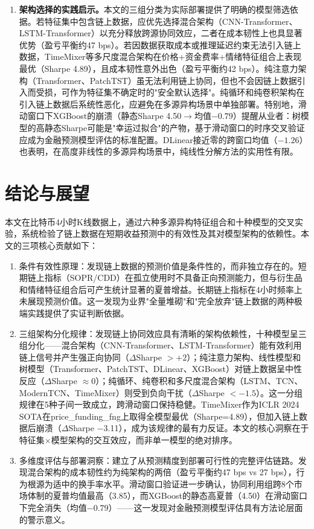 \documentclass[12pt,a4paper]{ctexart}
\begin{document}
\begin{enumerate}[label=(\arabic*),leftmargin=2.5em]
    

    \item \textbf{架构选择的实践启示。}本文的三组分类为实际部署提供了明确的模型筛选依据。若特征集中包含链上数据，应优先选择混合架构（CNN-Transformer、LSTM-Transformer）以充分释放跨源协同效应，二者在成本韧性上也具显著优势（盈亏平衡约47 bps）。若因数据获取成本或推理延迟约束无法引入链上数据，TimeMixer等多尺度混合架构在价格+资金费率+情绪特征组合上表现最优（Sharpe 4.89），且成本韧性意外出色（盈亏平衡约42 bps）。纯注意力架构（Transformer、PatchTST）虽无法利用链上协同，但也不会因链上数据引入而受损，可作为特征集不确定时的"安全默认选择"。纯循环和纯卷积架构在引入链上数据后系统性恶化，应避免在多源异构场景中单独部署。特别地，滑动窗口下XGBoost的崩溃（静态Sharpe 4.50$\to$均值$-0.79$）提醒从业者：树模型的高静态Sharpe可能是"幸运过拟合"的产物，基于滑动窗口的时序交叉验证应成为金融预测模型评估的标准配置。DLinear接近零的跨窗口均值（$-1.26$）也表明，在高度非线性的多源异构场景中，纯线性分解方法的实用性有限。
\end{enumerate}

\section{结论与展望}

本文在比特币4小时K线数据上，通过六种多源异构特征组合和十种模型的交叉实验，系统检验了链上数据在短期收益预测中的有效性及其对模型架构的依赖性。本文的三项核心贡献如下：

\begin{enumerate}[label=(\arabic*),leftmargin=2.5em]
    \item 条件有效性原理：发现链上数据的预测价值是条件性的，而非独立存在的。短期链上指标（SOPR/CDD）在孤立使用时不具备正向预测能力，但与衍生品和情绪特征组合后可产生统计显著的夏普增益。长期链上指标在4小时频率上未展现预测价值。这一发现为业界"全量堆砌"和"完全放弃"链上数据的两种极端实践提供了实证判断依据。
    \item 三组架构分化规律：发现链上协同效应具有清晰的架构依赖性，十种模型呈三组分化——混合架构（CNN-Transformer、LSTM-Transformer）能有效利用链上信号并产生强正向协同（$\Delta$Sharpe $> +2$）；纯注意力架构、线性模型和树模型（Transformer、PatchTST、DLinear、XGBoost）对链上数据呈中性反应（$\Delta$Sharpe $\approx 0$）；纯循环、纯卷积和多尺度混合架构（LSTM、TCN、ModernTCN、TimeMixer）则受到负向干扰（$\Delta$Sharpe $< -1.5$）。这一分组规律在5种子间一致成立，跨滑动窗口保持稳健。TimeMixer作为ICLR 2024 SOTA在price\_funding\_fng上取得全模型最优（Sharpe=4.89），但加入链上数据后崩溃（$\Delta$Sharpe $-$3.11），成为该规律的最有力反证。本文的核心洞察在于特征集$\times$模型架构的交互效应，而非单一模型的绝对排序。
    \item 多维度评估与部署洞察：建立了从预测精度到部署可行性的完整评估链路。发现混合架构的成本韧性约为纯架构的两倍（盈亏平衡约47 bps vs 27 bps），行为根源为适中的换手率水平。滑动窗口验证进一步确认，协同利用组跨8个市场体制的夏普均值最高（3.85），而XGBoost的静态高夏普（4.50）在滑动窗口下完全消失（均值$-0.79$）——这一发现对金融预测模型评估具有方法论层面的警示意义。
\end{enumerate}
\end{document}
